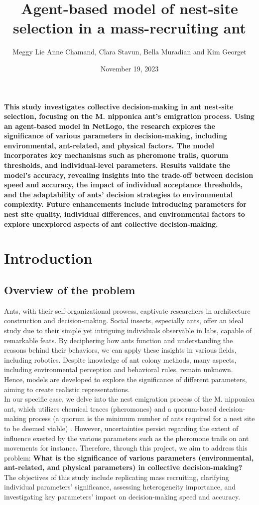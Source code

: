 \documentclass{article}
\title{Agent-based model of nest-site selection in a mass-recruiting ant \cite{agent_based_model}}
\author{Meggy Lie Anne  Chamand, Clara Stavun, Bella Muradian and Kim Georget}
\date{November 19, 2023}
\begin{document}
\maketitle


\textbf{This study investigates collective decision-making in ant nest-site selection, focusing on the M. nipponica ant's emigration process. Using an agent-based model in NetLogo, the research explores the significance of various parameters in decision-making, including environmental, ant-related, and physical factors. The model incorporates key mechanisms such as pheromone trails, quorum thresholds, and individual-level parameters. Results validate the model's accuracy, revealing insights into the trade-off between decision speed and accuracy, the impact of individual acceptance thresholds, and the adaptability of ants' decision strategies to environmental complexity. Future enhancements include introducing parameters for nest site quality, individual differences, and environmental factors to explore unexplored aspects of ant collective decision-making.}

\section{Introduction}
\subsection{Overview of the problem}
Ants, with their self-organizational prowess, captivate researchers in architecture construction and decision-making. Social insects, especially ants, offer an ideal study due to their simple yet intriguing individuals observable in labs, capable of remarkable feats. By deciphering how ants function and understanding the reasons behind their behaviors, we can apply these insights in various fields, including robotics. Despite knowledge of ant colony methods, many aspects, including environmental perception and behavioral rules, remain unknown. Hence, models are developed to explore the significance of different parameters, aiming to create realistic representations.\\
In our specific case, we delve into the nest emigration process of the M. nipponica ant, which utilizes chemical traces (pheromones) and a quorum-based decision-making process (a quorum is the minimum number of ants required for a nest site to be deemed viable) \cite{key_consensus_decision}. However, uncertainties persist regarding the extent of influence exerted by the various parameters such as the pheromone trails on ant movements for instance. Therefore, through this project, we aim to address this problem: \textbf{What is the significance of various parameters (environmental, ant-related, and physical parameters) in collective decision-making?}\\
The objectives of this study include replicating mass recruiting, clarifying individual parameters' significance, assessing heterogeneity importance, and investigating key parameters' impact on decision-making speed and accuracy.
 
\end{document}
